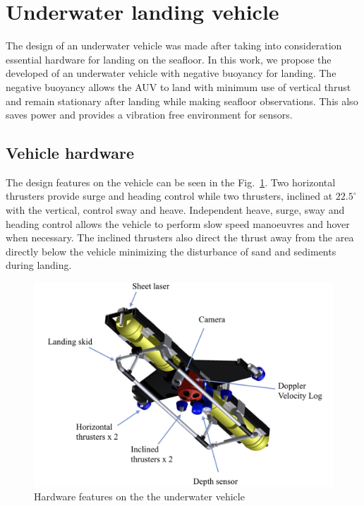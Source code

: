 \section{Underwater landing vehicle}

The design of an underwater vehicle was made after taking into consideration essential hardware for landing on the seafloor. In this work, we propose the developed of an underwater vehicle with negative buoyancy for landing. The negative buoyancy allows the AUV to land with minimum use of vertical thrust and remain stationary after landing while making seafloor observations. This also saves power and provides a vibration free environment for sensors. 


\subsection{Vehicle hardware}

 The design features on the vehicle can be seen in the Fig.~\ref{f:mehul2}. Two horizontal thrusters provide surge and heading control while two  thrusters, inclined at $22.5^\circ$ with the vertical, control sway and heave. Independent heave, surge, sway and heading control allows the vehicle to perform slow speed manoeuvres and hover when necessary. The inclined thrusters also direct the thrust away from the area directly below the vehicle minimizing the disturbance of sand and sediments during landing. 

\begin{figure}[!ht]
\centering\includegraphics[width=4.7in]{./images/mehul2.png}
\caption{Hardware features on the the underwater vehicle}
\label{f:mehul2}
\end{figure}

